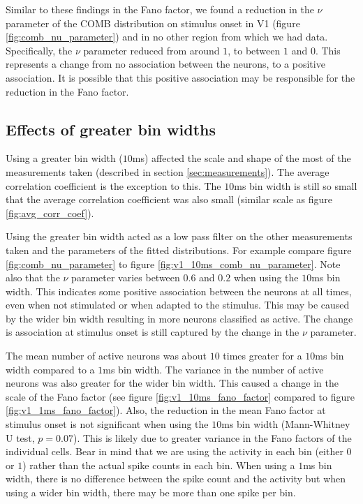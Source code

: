   Similar to these findings in the Fano factor, we found a reduction in the $\nu$ parameter of the COMB distribution on stimulus onset in V1 (figure \ref{fig:comb_nu_parameter}) and in no other region from which we had data. Specifically, the $\nu$ parameter reduced from around $1$, to between $1$ and $0$. This represents a change from no association between the neurons, to a positive association. It is possible that this positive association may be responsible for the reduction in the Fano factor.

  \subsection{Effects of greater bin widths}
  Using a greater bin width ($10$ms) affected the scale and shape of the most of the measurements taken (described in section \ref{sec:measurements}). The average correlation coefficient is the exception to this. The $10$ms bin width is still so small that the average correlation coefficient was also small (similar scale as figure \ref{fig:avg_corr_coef}).

  Using the greater bin width acted as a low pass filter on the other measurements taken and the parameters of the fitted distributions. For example compare figure \ref{fig:comb_nu_parameter} to figure \ref{fig:v1_10ms_comb_nu_parameter}. Note also that the $\nu$ parameter varies between $0.6$ and $0.2$ when using the $10$ms bin width. This indicates some positive association between the neurons at all times, even when not stimulated or when adapted to the stimulus. This may be caused by the wider bin width resulting in more neurons classified as active. The change is association at stimulus onset is still captured by the change in the $\nu$ parameter.

  The mean number of active neurons was about $10$ times greater for a $10$ms bin width compared to a $1$ms bin width. The variance in the number of active neurons was also greater for the wider bin width. This caused a change in the scale of the Fano factor (see figure \ref{fig:v1_10ms_fano_factor} compared to figure  \ref{fig:v1_1ms_fano_factor}). Also, the reduction in the mean Fano factor at stimulus onset is not significant when using the $10$ms bin width (Mann-Whitney U test, $p = 0.07$). This is likely due to greater variance in the Fano factors of the individual cells. Bear in mind that we are using the activity in each bin (either $0$ or $1$) rather than the actual spike counts in each bin. When using a $1$ms bin width, there is no difference between the spike count and the activity but when using a wider bin width, there may be more than one spike per bin.


